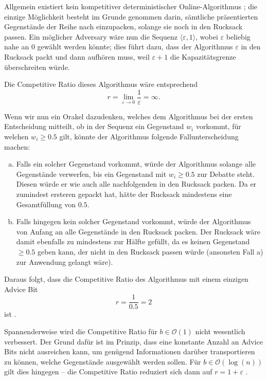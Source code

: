\documentclass[11pt]{scrreprt} %
\theoremstyle{definition}
\begin{document}
\bigskip
Allgemein existiert kein kompetitiver deterministischer Online-Algorithmus \cite{spaccamela}; die einzige Möglichkeit besteht im Grunde genommen darin, sämtliche präsentierten Gegenstände der Reihe nach einzupacken, solange sie noch in den Rucksack passen. Ein möglicher Adversary wäre nun die Sequenz $\langle \varepsilon, 1 \rangle$, wobei $\varepsilon$ beliebig nahe an $0$ gewählt werden könnte; dies führt dazu, dass der Algorithmus $\varepsilon$ in den Rucksack packt und dann aufhören muss, weil $\varepsilon + 1$ die Kapazitätsgrenze überschreiten würde.

Die Competitive Ratio dieses Algorithmus wäre entsprechend
\[
	r = \lim_{\varepsilon \rightarrow 0} \frac {1} { \varepsilon} = \infty.
\]

Wenn wir nun ein Orakel dazudenken, welches dem Algorithmus bei der ersten Entscheidung mitteilt, ob in der Sequenz ein Gegenstand $w_i$ vorkommt, für welchen $w_i \ge 0.5$ gilt, könnte der Algorithmus folgende Fallunterscheidung machen:

\begin{enumerate}[a)]
\item Falls ein solcher Gegenstand vorkommt, würde der Algorithmus solange alle Gegenstände verwerfen, bis ein Gegenstand mit $w_i \ge 0.5$ zur Debatte steht. Diesen würde er wie auch alle nachfolgenden in den Rucksack packen. Da er zumindest ersteren gepackt hat, hätte der Rucksack mindestens eine Gesamtfüllung von $0.5$.
\item Falls hingegen kein solcher Gegenstand vorkommt, würde der Algorithmus von Anfang an alle Gegenstände in den Rucksack packen. Der Rucksack wäre damit ebenfalls zu mindestens zur Hälfte gefüllt, da es keinen Gegenstand $\ge 0.5$ geben kann, der nicht in den Rucksack passen würde (ansonsten Fall a) zur Anwendung gelangt wäre).
\end{enumerate}

Daraus folgt, dass die Competitive Ratio des Algorithmus mit einem einzigen Advice Bit
\[
	r = \frac 1 {0.5} = 2
\]
ist \cite{knapsack}.

\bigskip
Spannenderweise wird die Competitive Ratio für $b \in \mathcal{O}(1)$ nicht wesentlich verbessert. Der Grund dafür ist im Prinzip, dass eine konstante Anzahl an Advice Bits nicht ausreichen kann, um genügend Informationen darüber transportieren zu können, welche Gegenstände ausgewählt werden sollen. Für $b \in \mathcal{O}(\log(n))$ gilt dies hingegen -- die Competitive Ratio reduziert sich dann auf $r = 1 + \varepsilon$ \cite{knapsack}.
\end{document}
